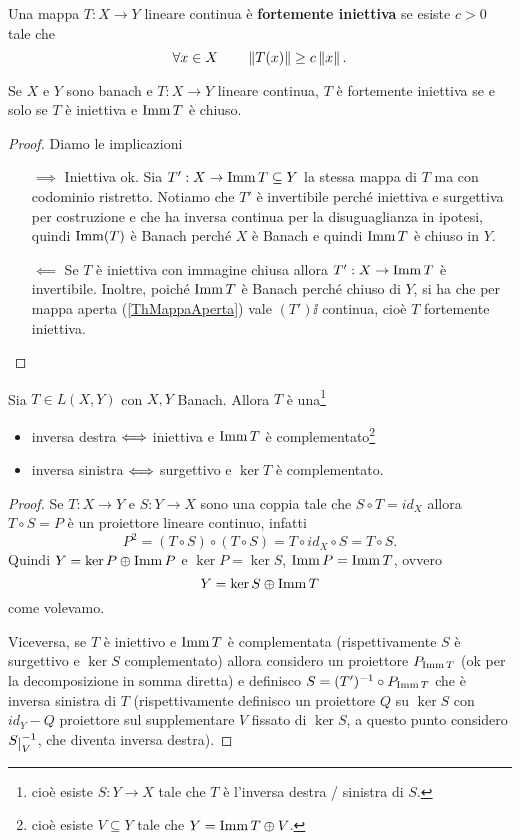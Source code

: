 \begin{definition}
Una mappa $T:X\to Y$ lineare continua \`e \textbf{fortemente iniettiva} se esiste $c>0$ tale che 
\[\forall x\in X\qquad \left\Vert{T(x)}\right\Vert\geq c\left\Vert{x}\right\Vert.\]
\end{definition}

\begin{proposition}
Se $X$ e $Y$ sono banach e $T:X\to Y$ lineare continua, $T$ \`e fortemente iniettiva se e solo se $T$ \`e iniettiva e $\operatorname{Imm} T$ \`e chiuso.
\end{proposition}
\begin{proof}
Diamo le implicazioni
\setlength{\leftmargini}{0cm}
\begin{itemize}
\item[$\boxed{\implies}$] Iniettiva ok. Sia $T':X\to \operatorname{Imm} T\subseteq Y$ la stessa mappa di $T$ ma con codominio ristretto. Notiamo che $T'$ \`e invertibile perch\'e iniettiva e surgettiva per costruzione e che ha inversa continua per la disuguaglianza in ipotesi, quindi $\operatorname{Imm}(T)$ \`e Banach perch\'e $X$ \`e Banach e quindi $\operatorname{Imm} T$ \`e chiuso in $Y$.
\item[$\boxed{\impliedby}$] Se $T$ \`e iniettiva con immagine chiusa allora $T':X\to \operatorname{Imm} T$ \`e invertibile. Inoltre, poich\'e $\operatorname{Imm} T$ \`e Banach perch\'e chiuso di $Y$, si ha che per mappa aperta (\ref{ThMappaAperta}) vale $(T')\ii$ continua, cio\`e $T$ fortemente iniettiva.
\end{itemize}
\setlength{\leftmargini}{0.5cm}
\end{proof}

\begin{proposition}\label{PrRetrazioniSezioniPerOperatoriLineariContinui}
Sia $T\in L(X,Y)$ con $X,Y$ Banach. Allora $T$ \`e una\footnote{cio\`e esiste $S:Y\to X$ tale che $T$ \`e l'inversa destra / sinistra di $S$.}
\begin{itemize}
    \item inversa destra $\Longleftrightarrow$ iniettiva e $\operatorname{Imm} T$ \`e complementato\footnote{cio\`e esiste $V\subseteq Y$ tale che $Y=\operatorname{Imm} T\oplus V$.}
    \item inversa sinistra $\Longleftrightarrow$ surgettivo e $\ker T$ \`e complementato.
\end{itemize}
\end{proposition}
\begin{proof}
Se $T:X\to Y$ e $S:Y\to X$ sono una coppia tale che $S\circ T=id_X$ allora $T\circ S=P$ \`e un proiettore lineare continuo, infatti
\[P^2=(T\circ S)\circ (T\circ S)=T\circ id_X \circ S=T\circ S.\]
Quindi $Y=\ker P\oplus \operatorname{Imm} P$ e $\ker P=\ker S$, $\operatorname{Imm} P=\operatorname{Imm} T$, ovvero
\[Y=\ker S\oplus \operatorname{Imm} T\]
come volevamo.
\medskip

Viceversa, se $T$ \`e iniettivo e $\operatorname{Imm} T$ \`e complementata (rispettivamente $S$ \`e surgettivo e $\ker S$ complementato) allora considero un proiettore $P_{\operatorname{Imm} T}$ (ok per la decomposizione in somma diretta) e definisco $S=(T')^{-1}\circ P_{\operatorname{Imm} T}$ che \`e inversa sinistra di $T$ (rispettivamente definisco un proiettore $Q$ su $\ker S$ con $id_Y-Q$ proiettore sul supplementare $V$ fissato di $\ker S$, a questo punto considero $S\res V\ii$, che diventa inversa destra).
\end{proof}

